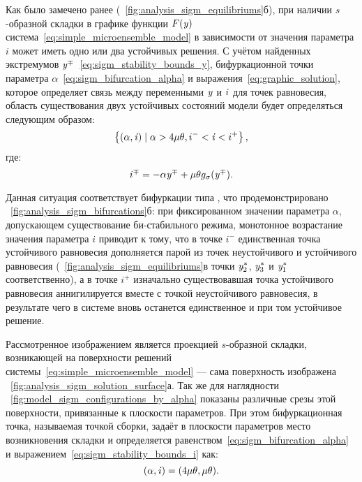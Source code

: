 Как было замечено ранее (\seefigure~\ref{fig:analysis_sigm_equilibriums}б), при наличии $s$-образной складки в графике функции $F(\mathit{y})$ система~\eqref{eq:simple_microensemble_model} в зависимости от значения параметра $i$ может иметь одно или два устойчивых решения. С учётом найденных экстремумов $\mathit{y}^{\mp}$~\eqref{eq:sigm_stability_bounds_y}, бифуркационной точки параметра $\alpha$~\eqref{eq:sigm_bifurcation_alpha} и выражения~\eqref{eq:graphic_solution}, которое определяет связь между переменными $\mathit{y}$ и $\mathit{i}$ для точек равновесия, область существования двух устойчивых состояний модели будет определяться следующим образом:
\begin{equation}
    \nonumber
    \left\{(\alpha, \mathit{i}) \mid \alpha > 4 \mu \theta, i^{-} < \mathit{i} < i^{+}\right\},
\end{equation}
где:
\begin{equation}
    \label{eq:sigm_stability_bounds_i}
    i^{\mp} = -\alpha \mathit{y}^{\mp} + \mu \theta g_{\sigma}(\mathit{y}^{\mp}).
\end{equation}

Данная ситуация соответствует бифуркации типа , что продемонстрировано \onfigure~\ref{fig:analysis_sigm_bifurcations}б: при фиксированном значении параметра $\alpha$, допускающем существование би-стабильного режима, монотонное возрастание значения параметра $i$ приводит к тому, что в точке $i^{-}$ единственная точка устойчивого равновесия дополняется парой из точек неустойчивого и устойчивого равновесия (\onfigure~\ref{fig:analysis_sigm_equilibriums}в точки $\mathit{y}^{*}_{2}$, $\mathit{y}^{*}_{3}$ и $\mathit{y}^{*}_{1}$ соответственно), а в точке $i^{+}$ изначально существовавшая точка устойчивого равновесия аннигилируется вместе с точкой неустойчивого равновесия, в результате чего в системе вновь останется единственное и при том устойчивое решение. 

Рассмотренное изображением является проекцией $s$-образной складки, возникающей на поверхности решений системы~\eqref{eq:simple_microensemble_model} --- сама поверхность изображена \onfigure~\ref{fig:analysis_sigm_solution_surface}а. Так же для наглядности \onfigure~\ref{fig:model_sigm_configurations_by_alpha} показаны различные срезы этой поверхности, привязанные к плоскости параметров. При этом бифуркационная точка, называемая точкой сборки, задаёт в плоскости параметров место возникновения складки и определяется равенством~\eqref{eq:sigm_bifurcation_alpha} и выражением~\eqref{eq:sigm_stability_bounds_i} как:
\begin{equation}
    \nonumber
    (\alpha, \mathit{i}) = (4 \mu \theta, \mu \theta).
\end{equation}

